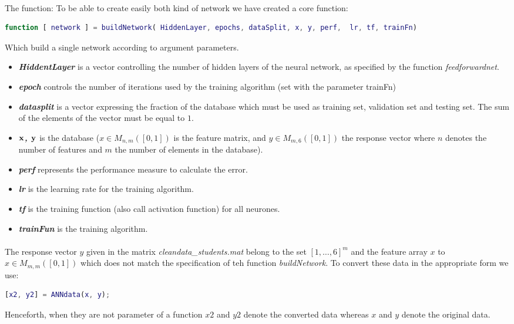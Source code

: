 \documentclass[a4paper,12pt,oneside,final]{report}
\newenvironment{changemargin}[2]{\begin{list}{}{%
\setlength{\topsep}{0pt}%
\setlength{\leftmargin}{0pt}%
\setlength{\rightmargin}{0pt}%
\setlength{\listparindent}{\parindent}%
\setlength{\itemindent}{\parindent}%
\setlength{\parsep}{0pt plus 1pt}%
\addtolength{\leftmargin}{#1}%
\addtolength{\rightmargin}{#2}%
}\item }{\end{list}}
\begin{document}
\paragraph{} The function:
To be able to create easily both kind of network we have created a core function:
\begin{changemargin}{-5mm}{-5mm}
\begin{lstlisting}[language=Matlab, frame=single]
function [ network ] = buildNetwork( HiddenLayer, epochs, dataSplit, x, y, perf,  lr, tf, trainFn)
\end{lstlisting}
\end{changemargin}
Which build a single network according to argument parameters. 
\label{ch:build}
\begin{itemize}
\item {\bf \textit{HiddentLayer} } is a vector controlling the number of hidden layers of the neural network, as specified by the function \textit{feedforwardnet}.
\item {\bf \textit{epoch} } controls the number of iterations used by the training algorithm (set with the parameter trainFn) 
\item {\bf \textit{datasplit} } is a vector expressing the fraction of the database which must be used as training set, validation set and testing set. The sum of the elements of the vector must be equal to $1$.
\item {\bf \textit{$\bf x$, $\bf y$} } is the database ($x\in M_{n,m}([0,1])$ is the feature matrix, and $y\in M_{m,6}([0,1])$ the response vector where $n$ denotes the number of features and $m$ the number of elements in the database).
\item {\bf \textit{perf} } represents the performance measure to calculate the error.
\item {\bf \textit{lr} } is the learning rate for the training algorithm.
\item {\bf \textit{tf} } is the training function (also call activation function) for all neurones.
\item {\bf \textit{trainFun} } is the training algorithm.
\end{itemize}
\paragraph{}
The response vector $y$ given in the matrix \textit{cleandata\_students.mat} belong to the set $[1,\hdots,6]^m$ and the feature array $x$ to $x\in M_{m,m}([0,1])$ which does not match the specification of teh function \textit{buildNetwork}. To convert these data in the appropriate form we use:
\begin{changemargin}{-5mm}{-5mm}
\begin{lstlisting}[language=Matlab, frame=single]
[x2, y2] = ANNdata(x, y);
\end{lstlisting}
\end{changemargin}
Henceforth, when they are not parameter of a function $x2$ and $y2$ denote the converted data whereas $x$ and $y$ denote the original data.
\end{document}
